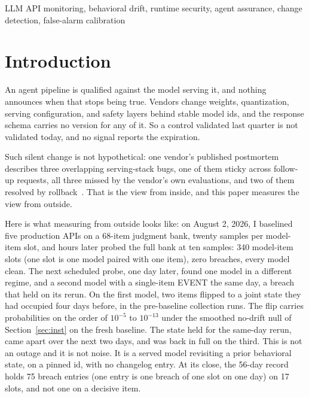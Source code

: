 \documentclass[conference]{IEEEtran}
\begin{document}
\begin{IEEEkeywords}
LLM API monitoring, behavioral drift, runtime security, agent
assurance, change detection, false-alarm calibration
\end{IEEEkeywords}

\section{Introduction}

An agent pipeline is qualified against the model serving it, and
nothing announces when that stops being true. Vendors change weights,
quantization, serving configuration, and safety layers behind stable
model ids, and the response schema carries no version for any of it.
So a control validated last quarter is not validated today, and no
signal reports the expiration.

Such silent change is not hypothetical: one vendor's published
postmortem describes three overlapping serving-stack bugs, one of them
sticky across follow-up requests, all three missed by the vendor's own
evaluations, and two of them resolved by
rollback~\cite{vendor-postmortem}. That is the view from inside, and
this paper measures the view from outside.

Here is what measuring from outside looks like: on August 2, 2026, I
baselined five production APIs on a 68-item judgment bank, twenty
samples per model-item slot, and hours later probed the full bank at
ten samples: 340 model-item slots (one slot is one model paired with
one item), zero breaches, every model clean. The next scheduled probe,
one day later, found one model in a different regime, and a second
model with a single-item EVENT the same day, a breach that held on its
rerun. On the first model, two items flipped to a joint state they had
occupied four days before, in the pre-baseline collection runs. The
flip carries probabilities on the order of $10^{-5}$ to $10^{-13}$
under the smoothed no-drift null of Section~\ref{sec:inst} on the
fresh baseline. The state held for the same-day rerun, came apart over
the next two days, and was back in full on the third. This is not an
outage and it is not noise. It is a served model revisiting a prior
behavioral state, on a pinned id, with no changelog entry. At its
close, the 56-day record holds 75 breach entries (one entry is one
breach of one slot on one day) on 17 slots, and not one on a decisive
item.
\end{document}
